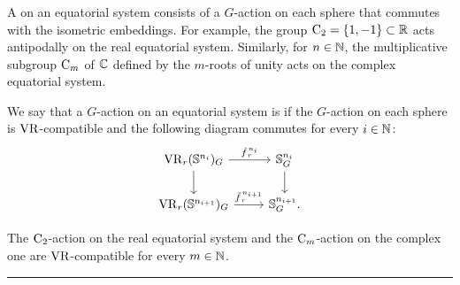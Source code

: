 \subsubsection{}

A  on an equatorial system consists of a \(G\)-action on each sphere that commutes with the isometric embeddings.
For example, the group \(\mathrm{C}_2 = \{1,-1\} \subset \mathbb{R}\) acts antipodally on the real equatorial system.
Similarly, for \(n \in \mathbb{N}\), the multiplicative subgroup \(\mathrm{C}_m\) of \(\mathbb{C}\) defined by the \(m\)-roots of unity acts on the complex equatorial system.

We say that a \(G\)-action on an equatorial system is  if the \(G\)-action on each sphere is \(\operatorname{VR}\)-compatible and the following diagram commutes for every \(i \in \mathbb{N}\):
\[
\begin{tikzcd}
	\VR_r(\bS^{n_i})_G
	\ar[d]
	\ar[r, "\tilde f_{\,r}^{\,n_i}" above]
	&
	\bS^{n_i}_G
	\ar[d]
	\\
	\VR_r(\bS^{n_{i+1}})_G
	\ar[r, "\tilde f_{\,r}^{\,n_{i+1}}" above]
	&
	\bS^{n_{i+1}}_G.
\end{tikzcd}
\]


\lemma The \(\mathrm{C}_2\)-action on the real equatorial system and the \(\mathrm{C}_m\)-action on the complex one are \(\operatorname{VR}\)-compatible for every \(m \in \mathbb{N}\).


\noindent\rule{\textwidth}{0.4pt}


